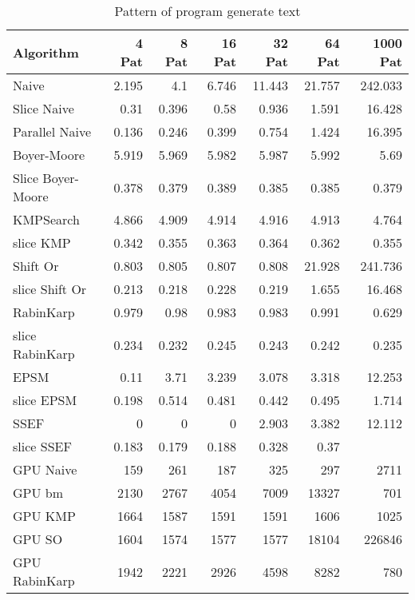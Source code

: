 \documentclass[11pt]{article}       %
\begin{document}
\begin{table}[htbp]
  \centering
  \caption{Pattern of program generate text}
    \begin{tabular}{lrrrrrr}\label{t3}
Algorithm & 4 Pat & 8 Pat & 16 Pat & 32 Pat & 64 Pat & 1000 Pat \\
 \hline
    Naive & 2.195 & 4.1   & 6.746 & 11.443 & 21.757 & 242.033 \\
    Slice Naive & 0.31  & 0.396 & 0.58  & 0.936 & 1.591 & 16.428 \\
    Parallel Naive & 0.136 & 0.246 & 0.399 & 0.754 & 1.424 & 16.395 \\
    {Boyer-Moore} & 5.919 & 5.969 & 5.982 & 5.987 & 5.992 & 5.69 \\
    Slice Boyer-Moore & 0.378 & 0.379 & 0.389 & 0.385 & 0.385 & 0.379 \\
    KMPSearch & 4.866 & 4.909 & 4.914 & 4.916 & 4.913 & 4.764 \\
    slice KMP & 0.342 & 0.355 & 0.363 & 0.364 & 0.362 & 0.355 \\
    Shift Or & 0.803 & 0.805 & 0.807 & 0.808 & 21.928 & 241.736 \\
    slice Shift Or & 0.213 & 0.218 & 0.228 & 0.219 & 1.655 & 16.468 \\
    RabinKarp & 0.979 & 0.98  & 0.983 & 0.983 & 0.991 & 0.629 \\
    slice RabinKarp & 0.234 & 0.232 & 0.245 & 0.243 & 0.242 & 0.235 \\
    EPSM  & 0.11  & 3.71  & 3.239 & 3.078 & 3.318 & 12.253 \\
    slice EPSM & 0.198 & 0.514 & 0.481 & 0.442 & 0.495 & 1.714 \\
    SSEF  & 0     & 0     & 0     & 2.903 & 3.382 & 12.112 \\
    slice SSEF & 0.183 & 0.179 & 0.188 & 0.328 & 0.37  &  \\
    GPU Naive & 159   & 261   & 187   & 325   & 297   & 2711 \\
    GPU bm & 2130  & 2767  & 4054  & 7009  & 13327 & 701 \\
    GPU KMP & 1664  & 1587  & 1591  & 1591  & 1606  & 1025 \\
    GPU SO & 1604  & 1574  & 1577  & 1577  & 18104 & 226846 \\
    GPU RabinKarp & 1942  & 2221  & 2926  & 4598  & 8282  & 780 \\

    \end{tabular}%
  \label{tab:addlabel}%
\end{table}%
\end{document}
